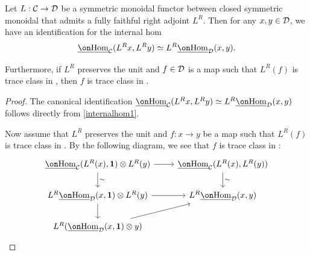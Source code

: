 \documentclass[a4paper,10pt, oneside]{amsart}
\begin{document}
	\begin{lem}\label{locinternalhom}
		Let $L:\mathcal{C}\to\mathcal{D}$ be a  symmetric monoidal functor between closed symmetric monoidal \infcats that admits a fully faithful right adjoint $L^R$. Then for any $x,y\in \mathcal{D}$, we have an identification for the internal hom $$\underline{\Hom}_{\mcc}(L^Rx,L^Ry)\simeq L^R\underline{\Hom}_{\mcd}(x,y).$$
		
		Furthermore, if $L^R$ preserves the unit and $f\in \mathcal{D} $ is a map such that $L^R(f)$ is trace class in \mcc, then $f$ is trace class in \mcd.
	\end{lem}
	\begin{proof}

		The canonical identification  $\underline{\Hom}_{\mcc}(L^Rx,L^Ry) \simeq L^R\underline{\Hom}_{\mcd}(x,y)$ follows directly from \cref{internalhom1}.
		
		Now assume that $L^R$ preserves the unit and $f:x\to y$ be a map such that $L^R(f)$ is trace class in \mcc. By the following diagram, we see that $f$ is trace class in \mcd:
		$$\begin{tikzcd}
			{\underline{\Hom}_{\mcc}(L^R(x),\mb{1})\otimes L^R(y)} \arrow[d, "\sim"] \arrow[r] & {\underline{\Hom}_{\mcc}(L^R(x),L^R(y))} \arrow[d, "\sim"] \\
			{L^R\underline{\Hom}_{\mcd}(x,\mb{1})\otimes L^R(y)} \arrow[r] \arrow[d]                                     & {L^R\underline{\Hom}_{\mcd}(x,y)}                                                  \\
			{L^R(\underline{\Hom}_{\mcd}(x,\mb{1})\otimes y)} \arrow[ru]                                               &                                                                         
		\end{tikzcd}$$
	\end{proof}
\end{document}
